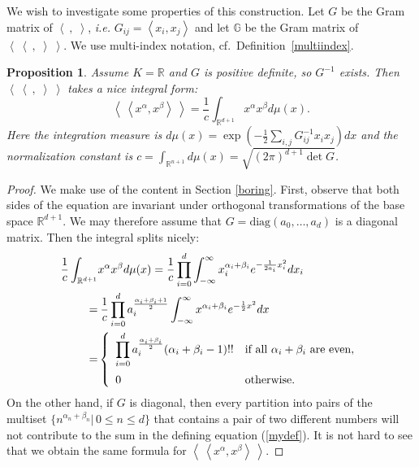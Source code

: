 \documentclass{amsart}
\newcommand{\ie}{{\it i.e. }}
\newcommand{\bra}{\left<\!\!\!\:\left<}
\newcommand{\ket}{\right>\!\!\!\:\right>}
\newcommand{\G}{\mathbb{G}}
\newcommand{\R}{\mathbb{R}}
\theoremstyle{plain}
\newtheorem{proposition}[theorem]{Proposition}
\theoremstyle{definition}
\theoremstyle{remark}
\begin{document}
We wish to investigate some properties of this construction. Let $G$ be the Gram matrix of $\left< \ ,\;\right>$, \ie $G_{ij} = \left<x_i,x_j\right>$ and
let $\G$ be the Gram matrix of $\bra\ ,\;\ket$. We use multi-index notation, cf.~Definition~\ref{multiindex}.
\begin{proposition} Assume $K=\R$ and $G$ is positive definite, so $G^{-1} $ exists. Then $\bra\ ,\;\ket$ takes a nice integral form:
\begin{equation}
\bra x^\alpha, x^\beta \ket = \frac{1}{c}\int_{\R^{d+1}} x^\alpha x^\beta d\mu(x).
\end{equation}
Here the integration measure is $d\mu(x) = \exp\left(-\frac{1}{2}\sum_{i,j} G^{-1}_{ij}x_ix_j\right)dx$ and the normalization constant is $c=\int_{\R^{n+1}} d\mu(x)=\sqrt{(2\pi)^{d+1}\det G}$.
\end{proposition}
\begin{proof} We make use of the content in Section \ref{boring}.
First, observe that both sides of the equation are invariant under orthogonal transformations of the base space $\R^{d+1}$. We may therefore assume that $G= \text{diag}\left(a_0,\ldots,a_d\right)$ is a diagonal matrix. Then the integral splits nicely:
\begin{align*}
\frac{1}{c}\int_{\R^{d+1}}& x^\alpha x^\beta d\mu(x)= \frac{1}{c}\prod_{i=0}^d \int_{-\infty}^\infty x_i^{\alpha_i+\beta_i} e^{-\frac{1}{2a_i}x_i^2}dx_i \\=&\: 
\frac{1}{c}\prod_{i=0}^d a_i^{\frac{\alpha_i+\beta_i+1}{2}}\int_{-\infty}^\infty x^{\alpha_i+\beta_i} e^{-\frac{1}{2}x^2}dx\\
=&\left\{
\begin{array}{*2{l}p{5cm}}\displaystyle \prod_{i=0}^d a_i^{\frac{\alpha_i+\beta_i}{2}}(\alpha_i+\beta_i-1)!! &\text{if all }\alpha_i+\beta_i\text{ are even}, \vspace{0.2cm} \\ 
 0 &\text{otherwise}.
\end{array}
 \right.
\end{align*}
On the other hand, if $G$ is diagonal, then every partition into pairs of the multiset $\{n^{\alpha_n+\beta_n}|\,0\!\leq\!n\!\leq\! d\}$ that contains a pair of two different numbers will not contribute to the sum in the defining equation (\ref{mydef}). It is not hard to see that we obtain the same formula for $\bra x^\alpha, x^\beta \ket$.
\end{proof}
\end{document}
